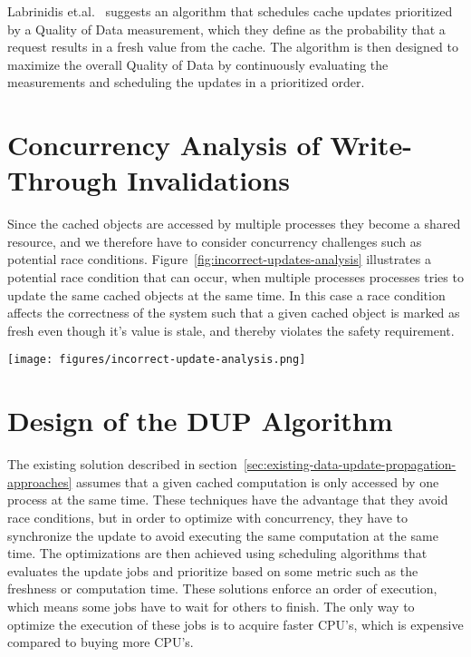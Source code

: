 Labrinidis et.al.~\cite{paper:update-propagation-strategies} suggests an algorithm that schedules cache updates prioritized by a Quality of Data measurement, which they define as the probability that a request results in a fresh value from the cache. The algorithm is then designed to maximize the overall Quality of Data by continuously evaluating the measurements and scheduling the updates in a prioritized order.


\section{Concurrency Analysis of Write-Through Invalidations}
\label{sec:race-condition-on-write-through-invalidation}
Since the cached objects are accessed by multiple processes they become a shared resource, and we therefore have to consider concurrency challenges such as potential race conditions. Figure~\ref{fig:incorrect-updates-analysis} illustrates a potential race condition that can occur, when multiple processes processes tries to update the same cached objects at the same time. In this case a race condition affects the correctness of the system such that a given cached object is marked as fresh even though it's value is stale, and thereby violates the safety requirement.

\begin{figure*}[ht!]
  \centering
  \texttt{[image: figures/incorrect-update-analysis.png]}
  \caption{Showing how two concurrent caching updates from two different application servers results in an inconsistent state. We see that even though the request from \emph{Update Process 2} are based on data older than \emph{Update Process 1} it gets to write.}
  \label{fig:incorrect-updates-analysis}
\end{figure*}


\section{Design of the DUP Algorithm}
\label{sec:the-data-update-propagation-algorithm}
The existing solution described in section~\ref{sec:existing-data-update-propagation-approaches} assumes that a given cached computation is only accessed by one process at the same time. These techniques have the advantage that they avoid race conditions, but in order to optimize with concurrency, they have to synchronize the update to avoid executing the same computation at the same time. The optimizations are then achieved using scheduling algorithms that evaluates the update jobs and prioritize based on some metric such as the freshness or computation time. These solutions enforce an order of execution, which means some jobs have to wait for others to finish. The only way to optimize the execution of these jobs is to acquire faster CPU's, which is expensive compared to buying more CPU's.

